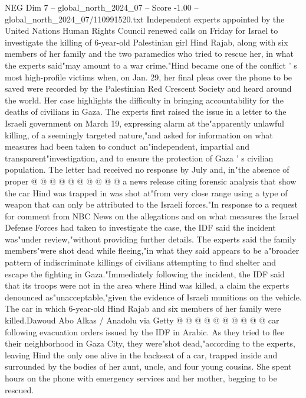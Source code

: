 \begin{textsample}{NEG Dim 7 – global\_north\_2024\_07 – Score -1.00 – global\_north\_2024\_07/110991520.txt}  \label{ex:f7_neg_407}
Independent experts appointed by the United Nations Human Rights Council renewed calls on Friday for Israel to investigate the killing of 6-year-old Palestinian girl Hind Rajab, along with six members of her family and the two paramedics who tried to rescue her, in what the experts said"may amount to a war crime."Hind became one of the conflict ' s most high-profile victims when, on Jan. 29, her final pleas over the phone to be saved were recorded by the Palestinian Red Crescent Society and heard around the world.
Her case highlights the difficulty in bringing accountability for the deaths of civilians in Gaza.
The experts first raised the issue in a letter to the Israeli government on March 19, expressing alarm at the"apparently unlawful killing, of a seemingly targeted nature,"and asked for information on what measures had been taken to conduct an"independent, impartial and transparent"investigation, and to ensure the protection of Gaza ' s civilian population.
The letter had received no response by July and, in"the absence of proper @ @ @ @ @ @ @ @ @ @ a news release citing forensic analysis that show the car Hind was trapped in was shot at"from very close range using a type of weapon that can only be attributed to the Israeli forces."In response to a request for comment from NBC News on the allegations and on what measures the Israel Defense Forces had taken to investigate the case, the IDF said the incident was"under review,"without providing further details.
The experts said the family members"were shot dead while fleeing,"in what they said appears to be a"broader pattern of indiscriminate killings of civilians attempting to find shelter and escape the fighting in Gaza."Immediately following the incident, the IDF said that its troops were not in the area where Hind was killed, a claim the experts denounced as"unacceptable,"given the evidence of Israeli munitions on the vehicle.
The car in which 6-year-old Hind Rajab and six members of her family were killed.Dawoud Abo Alkas / Anadolu via Getty @ @ @ @ @ @ @ @ @ @ car following evacuation orders issued by the IDF in Arabic.
As they tried to flee their neighborhood in Gaza City, they were"shot dead,"according to the experts, leaving Hind the only one alive in the backseat of a car, trapped inside and surrounded by the bodies of her aunt, uncle, and four young cousins.
She spent hours on the phone with emergency services and her mother, begging to be rescued.

\end{textsample}

